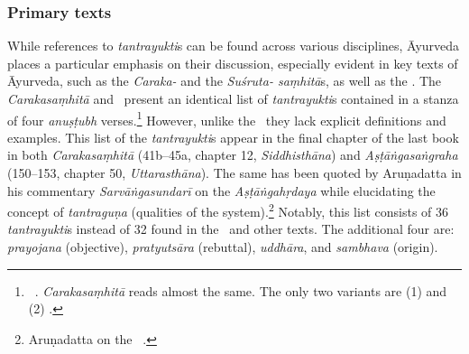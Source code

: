 \subsubsection{Primary texts}
While references to \emph{tantrayukti}s can be found across various disciplines, Āyurveda places a particular emphasis on their discussion, especially evident in key texts of Āyurveda, such as the \emph{Caraka-} and the \emph{Suśruta- saṃhitā}s, as well as the \AS. The \emph{Carakasaṃhitā} and \AS\ present an identical list of \emph{tantrayukti}s contained in a stanza of four \emph{anuṣṭubh} verses.\footnote{\label{CaAsT}
	\begin{verse}
	\end{verse}
	\AS\ . \emph{Carakasaṃhitā}  reads almost the same. The only two variants are (1)  and (2) .
	} 
However, unlike the \SS\ they lack explicit definitions and examples. This list of the \emph{tantrayukti}s appear in the final chapter of the last book in both \emph{Carakasaṃhitā} (41b--45a, chapter 12, \emph{Siddhisthāna}) and \emph{Aṣṭāṅgasaṅgraha} (150--153, chapter 50, \emph{Uttarasthāna}). The same has been quoted by Aruṇadatta in his commentary \emph{Sarvāṅgasundarī} on the \emph{Aṣṭāṅgahṛdaya} while elucidating the concept of \emph{tantraguṇa} (qualities of the system).\footnote{Aruṇadatta on the \AHS\ .} 
Notably, this list consists of 36 \emph{tantrayukti}s instead of 32 found in the \SS\ and other texts. The additional four are: \emph{prayojana} (objective), \emph{pratyutsāra} (rebuttal), \emph{uddhāra}, and \emph{sambhava} (origin). 

